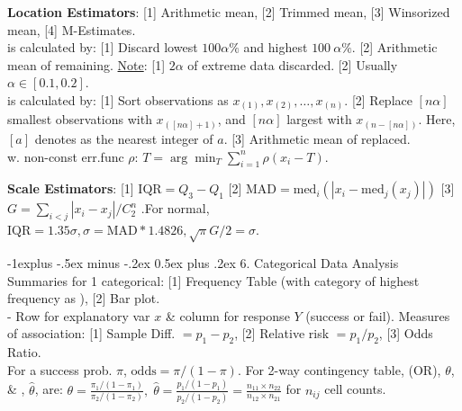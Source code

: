 \documentclass[10pt,landscape,letterpaper]{article}
\makeatletter
\renewcommand{\subsection}{\@startsection{subsection}{2}{0mm}%
                                {-1explus -.5ex minus -.2ex}%
                                {0.5ex plus .2ex}%
                                {\sffamily\normalsize\itshape}}
\makeatother
\begin{document}
\begin{multicols}{3}
\textbf{Location Estimators}: [1] Arithmetic mean, [2] Trimmed mean, [3] Winsorized mean, [4] M-Estimates.
\\
 is calculated by: [1] Discard lowest $100 \alpha \%$ and highest $100 \ \alpha \%$. [2] Arithmetic mean of remaining.
\underline{Note}: [1] $2 \alpha$ of extreme data discarded. [2] Usually $\alpha \in [0.1, 0.2]$.
\\
 is calculated by: [1] Sort observations as $x_{(1)}, x_{(2)}, …, x_{(n)}$. [2] Replace $[n\alpha]$ smallest observations with $x_{([n\alpha]+1)}$, and $[n\alpha]$ largest with $x_{(n-[n\alpha])}$. Here, $[a]$ denotes as the nearest integer of $a$. [3] Arithmetic mean of replaced.
\\
 w. non-const err.func $\rho$:
$
T = \arg\min_T \sum_{i=1}^n \rho(x_i - T) 
$.


\textbf{Scale Estimators}: [1]  $\text{IQR} = Q_3 - Q_1$ [2]  $\text{MAD} = \text{med}_i  ( |x_i - \text{med}_j(x_j)| )$ [3]  $G = \sum_{i < j} |x_i - x_j| / C_2^n$
.For normal, $\text{IQR} = 1.35 \sigma, \sigma = \text{MAD} * 1.4826, \sqrt{\pi} G / 2 = \sigma$.




\subsection{6. Categorical Data Analysis}
Summaries for 1 categorical: [1] Frequency Table (with category of highest frequency as ), [2] Bar plot.
\\
 - Row for explanatory var $x$ \& column for response $Y$ (success or fail).  Measures of association: [1] Sample Diff. $= p_1 - p_2$, [2] Relative risk $= p_1 / p_2$, [3] Odds Ratio.
\\
For a success prob. $\pi$,  $\text{odds} = \pi / (1 - \pi)$. For 2-way contingency table,  (OR), $\theta$, \& , $\hat \theta$, are:
$
\theta = \frac{\pi_1 / (1 - \pi_1)}{\pi_2 / (1 - \pi_2)}, \; \hat{\theta} = \frac{p_1 / (1 - p_1)}{p_2 / (1 - p_2)} = \frac{n_{11} \times n_{22}}{n_{12} \times n_{21}}
$ for $n_{ij}$ cell counts. 


\end{multicols}
\end{document}

